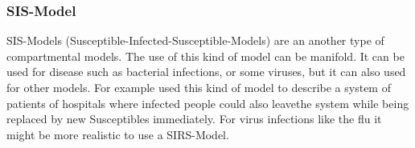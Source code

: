\subsubsection{SIS-Model}
SIS-Models (Susceptible-Infected-Susceptible-Models) are an another type of compartmental models. The use of this kind of model can be manifold. It can be used for disease such as bacterial infections, or some viruses, but it can also used for other models. For example \citep{BEL16} used this kind of model to describe a system of patients of hospitals where infected people could also \glqq leave\grqq the system while being replaced by new Susceptibles immediately. For virus infections like the flu it might be more realistic to use a SIRS-Model.